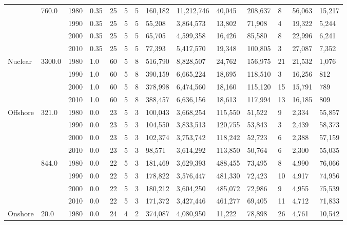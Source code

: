 \begin{table}[]
\begin{tabular}{|l|l|l|l|l|l|l|l|l|l|l|l|l|l|}
	& \multirow{4}{*}{760.0} & 1980 & 0.35 & 25 & 5 & 5 & 160,182 & 11,212,746 & 40,045 & 208,637 & 8 & 56,063 & 15,217 \\ \cline{3-14} 
	&  & 1990 & 0.35 & 25 & 5 & 5 & 55,208 & 3,864,573 & 13,802 & 71,908 & 4 & 19,322 & 5,244 \\ \cline{3-14} 
	&  & 2000 & 0.35 & 25 & 5 & 5 & 65,705 & 4,599,358 & 16,426 & 85,580 & 8 & 22,996 & 6,241 \\ \cline{3-14} 
	&  & 2010 & 0.35 & 25 & 5 & 5 & 77,393 & 5,417,570 & 19,348 & 100,805 & 3 & 27,087 & 7,352 \\ \hline
	\multirow{4}{*}{Nuclear} & \multirow{4}{*}{3300.0} & 1980 & 1.0 & 60 & 5 & 8 & 516,790 & 8,828,507 & 24,762 & 156,975 & 21 & 21,532 & 1,076 \\ \cline{3-14} 
	&  & 1990 & 1.0 & 60 & 5 & 8 & 390,159 & 6,665,224 & 18,695 & 118,510 & 3 & 16,256 & 812 \\ \cline{3-14} 
	&  & 2000 & 1.0 & 60 & 5 & 8 & 378,998 & 6,474,560 & 18,160 & 115,120 & 15 & 15,791 & 789 \\ \cline{3-14} 
	&  & 2010 & 1.0 & 60 & 5 & 8 & 388,457 & 6,636,156 & 18,613 & 117,994 & 13 & 16,185 & 809 \\ \hline
	\multirow{8}{*}{Offshore} & \multirow{4}{*}{321.0} & 1980 & 0.0 & 23 & 5 & 3 & 100,043 & 3,668,254 & 115,550 & 51,522 & 9 & 2,334 & 55,857 \\ \cline{3-14} 
	&  & 1990 & 0.0 & 23 & 5 & 3 & 104,550 & 3,833,513 & 120,755 & 53,843 & 3 & 2,439 & 58,373 \\ \cline{3-14} 
	&  & 2000 & 0.0 & 23 & 5 & 3 & 102,374 & 3,753,742 & 118,242 & 52,723 & 6 & 2,388 & 57,159 \\ \cline{3-14} 
	&  & 2010 & 0.0 & 23 & 5 & 3 & 98,571 & 3,614,292 & 113,850 & 50,764 & 6 & 2,300 & 55,035 \\ \cline{2-14} 
	& \multirow{4}{*}{844.0} & 1980 & 0.0 & 22 & 5 & 3 & 181,469 & 3,629,393 & 488,455 & 73,495 & 8 & 4,990 & 76,066 \\ \cline{3-14} 
	&  & 1990 & 0.0 & 22 & 5 & 3 & 178,822 & 3,576,447 & 481,330 & 72,423 & 10 & 4,917 & 74,956 \\ \cline{3-14} 
	&  & 2000 & 0.0 & 22 & 5 & 3 & 180,212 & 3,604,250 & 485,072 & 72,986 & 9 & 4,955 & 75,539 \\ \cline{3-14} 
	&  & 2010 & 0.0 & 22 & 5 & 3 & 171,372 & 3,427,446 & 461,277 & 69,405 & 11 & 4,712 & 71,833 \\ \hline
	\multirow{4}{*}{Onshore} & \multirow{4}{*}{20.0} & 1980 & 0.0 & 24 & 4 & 2 & 374,087 & 4,080,950 & 11,222 & 78,898 & 26 & 4,761 & 10,542 \\ \cline{3-14} 

\end{tabular}
\end{table}
